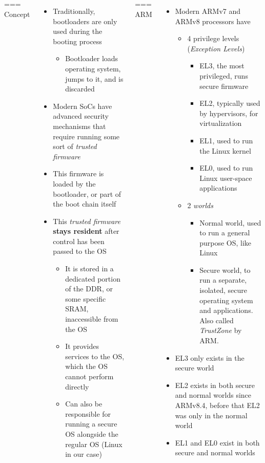 \begin{columns}
=== {Concept}
  \begin{itemize}
  \item Traditionally, bootloaders are only used during the booting
    process
    \begin{itemize}
    \item Bootloader loads operating system, jumps to it, and is
      discarded
    \end{itemize}
  \item Modern SoCs have advanced security mechanisms that require
    running some sort of {\em trusted firmware}
  \item This firmware is loaded by the bootloader, or part of the boot
    chain itself
  \item This {\em trusted firmware} {\bf stays resident} after control
    has been passed to the OS
    \begin{itemize}
    \item It is stored in a dedicated portion of the DDR, or some
      specific SRAM, inaccessible from the OS
    \item It provides services to the OS, which the OS cannot perform
      directly
    \item Can also be responsible for running a secure OS alongside the
      regular OS (Linux in our case)
    \end{itemize}
  \end{itemize}


=== {ARM}
  \begin{itemize}
  \item Modern ARMv7 and ARMv8 processors have
    \begin{itemize}
    \item 4 privilege levels ({\em Exception Levels})
      \begin{itemize}
      \item EL3, the most privileged, runs secure firmware
      \item EL2, typically used by hypervisors, for virtualization
      \item EL1, used to run the Linux kernel
      \item EL0, used to run Linux user-space applications
      \end{itemize}
    \item 2 {\em worlds}
      \begin{itemize}
      \item Normal world, used to run a general purpose OS, like Linux
      \item Secure world, to run a separate, isolated, secure
        operating system and applications. Also called {\em TrustZone}
        by ARM.
      \end{itemize}
    \end{itemize}
  \item EL3 only exists in the secure world
  \item EL2 exists in both secure and normal worlds since ARMv8.4,
    before that EL2 was only in the normal world
  \item EL1 and EL0 exist in both secure and normal worlds
  \end{itemize}



\end{columns}
